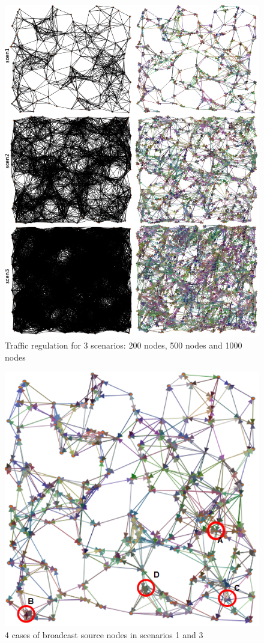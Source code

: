 \documentclass[sigconf]{acmart}
\begin{document}
\begin{figure}[h]
\centering
\includegraphics[width=\columnwidth]{nanonet.pdf}
\caption{Traffic regulation for 3 scenarios: 200 nodes, 500 nodes and 1000 nodes}
\label{nanonet}
\end{figure}

\begin{figure}[h]
\centering
\includegraphics[width=\columnwidth]{broadcast.png}
\caption{4 cases of broadcast source nodes in scenarios 1 and 3}
\label{broadcast}
\end{figure}
\end{document}
